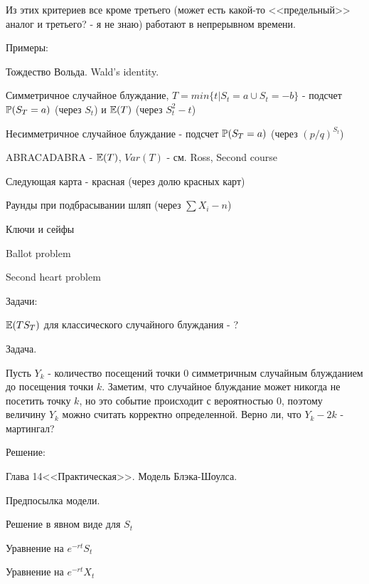 {Из этих критериев все кроме третьего (может есть какой-то <<предельный>> аналог и третьего? - я не знаю) работают в непрерывном времени.


Примеры:


Тождество Вольда. Wald's identity.

Симметричное случайное блуждание, $T=min\{t|S_{t}=a\cup S_{t}=-b\}$ - подсчет $\P(S_{T}=a)$ (через $S_{t}$) и $\E(T)$ (через $S_{t}^{2}-t$)

Несимметричное случайное блуждание - подсчет $\P(S_{T}=a)$ (через $(p/q)^{S_{t}}$)

ABRACADABRA - $\E(T)$, $Var(T)$ - см. Ross, Second course

Следующая карта - красная (через долю красных карт)

Раунды при подбрасывании шляп (через $\sum X_{i} -n$) %

Ключи и сейфы

Ballot problem %

Second heart problem %






Задачи:


$\E(TS_{T})$ для классического случайного блуждания - ?





Задача.

Пусть $Y_{k}$ - количество посещений точки 0 симметричным случайным блужданием до посещения точки $k$. Заметим, что случайное блуждание может никогда не посетить точку $k$, но это событие происходит с вероятностью 0, поэтому величину $Y_{k}$ можно считать корректно определенной.
Верно ли, что $Y_{k}-2k$ - мартингал?

Решение:




Глава 14<<Практическая>>. Модель Блэка-Шоулса. \par

Предпосылка модели. \par
Решение в явном виде для $S_{t}$ \par

Уравнение на $e^{-rt}S_{t}$ \par
Уравнение на $e^{-rt}X_{t}$ \par

}
